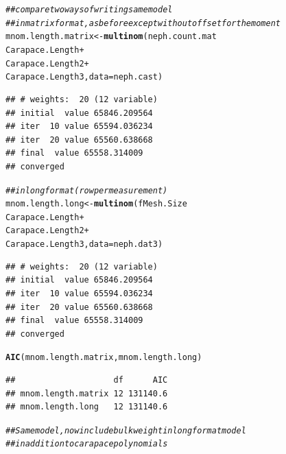 \documentclass[12pt]{article}\usepackage[]{graphicx}\usepackage[]{color}
\makeatletter
\newcommand{\hlcom}[1]{\textcolor[rgb]{0.678,0.584,0.686}{\textit{#1}}}%
\newcommand{\hlopt}[1]{\textcolor[rgb]{0,0,0}{#1}}%
\newcommand{\hlstd}[1]{\textcolor[rgb]{0.345,0.345,0.345}{#1}}%
\newcommand{\hlkwb}[1]{\textcolor[rgb]{0.69,0.353,0.396}{#1}}%
\newcommand{\hlkwc}[1]{\textcolor[rgb]{0.333,0.667,0.333}{#1}}%
\newcommand{\hlkwd}[1]{\textcolor[rgb]{0.737,0.353,0.396}{\textbf{#1}}}%
\newenvironment{kframe}{%
 \def\at@end@of@kframe{}%
 \ifinner\ifhmode%
  \def\at@end@of@kframe{\end{minipage}}%
  \begin{minipage}{\columnwidth}%
 \fi\fi%
 \def\FrameCommand##1{\hskip\@totalleftmargin \hskip-\fboxsep
 \colorbox{shadecolor}{##1}\hskip-\fboxsep
     \hskip-\linewidth \hskip-\@totalleftmargin \hskip\columnwidth}%
 \MakeFramed {\advance\hsize-\width
   \@totalleftmargin\z@ \linewidth\hsize
   \@setminipage}}%
 {\par\unskip\endMakeFramed%
 \at@end@of@kframe}
\newenvironment{knitrout}{}{} %
\makeatother
\begin{document}
\begin{knitrout}\footnotesize
{}\color{fgcolor}\begin{kframe}
\begin{alltt}
\hlcom{## compare two ways of writing same model}
\hlcom{## in matrix format, as before except without offset for the moment}
\hlstd{mnom.length.matrix} \hlkwb{<-} \hlkwd{multinom}\hlstd{(neph.count.mat} \hlopt{~}
                               \hlstd{Carapace.Length} \hlopt{+}
                               \hlstd{Carapace.Length2} \hlopt{+}
                               \hlstd{Carapace.Length3,} \hlkwc{data} \hlstd{= neph.cast)}
\end{alltt}
\begin{verbatim}
## # weights:  20 (12 variable)
## initial  value 65846.209564 
## iter  10 value 65594.036234
## iter  20 value 65560.638668
## final  value 65558.314009 
## converged
\end{verbatim}
\begin{alltt}
\hlcom{## in long format (row per measurement)}
\hlstd{mnom.length.long} \hlkwb{<-} \hlkwd{multinom}\hlstd{(fMesh.Size} \hlopt{~}
                             \hlstd{Carapace.Length} \hlopt{+}
                             \hlstd{Carapace.Length2} \hlopt{+}
                             \hlstd{Carapace.Length3,} \hlkwc{data} \hlstd{= neph.dat3)}
\end{alltt}
\begin{verbatim}
## # weights:  20 (12 variable)
## initial  value 65846.209564 
## iter  10 value 65594.036234
## iter  20 value 65560.638668
## final  value 65558.314009 
## converged
\end{verbatim}
\begin{alltt}
\hlkwd{AIC}\hlstd{(mnom.length.matrix, mnom.length.long)}
\end{alltt}
\begin{verbatim}
##                    df      AIC
## mnom.length.matrix 12 131140.6
## mnom.length.long   12 131140.6
\end{verbatim}
\begin{alltt}
\hlcom{## Same model, now include bulk weight in long format model }
\hlcom{## in addition to carapace polynomials}


\end{alltt}
\end{kframe}
\end{knitrout}
\end{document}
